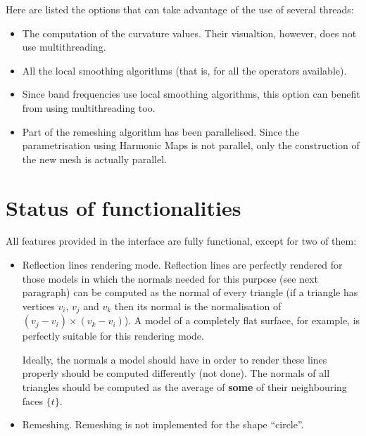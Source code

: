 \documentclass[12pt]{article}
\begin{document}
Here are listed the options that can take advantage of the use of
several threads:
\begin{itemize}
	\item The computation of the curvature values. Their visualtion, however,
	does not use multithreading.
	\item All the local smoothing algorithms (that is, for all the operators
	available).
	\item Since band frequencies use local smoothing algorithms, this
	option can benefit from using multithreading too.
	\item Part of the remeshing algorithm has been parallelised. Since
	the parametrisation using Harmonic Maps is not parallel, only the
	construction of the new mesh is actually parallel.
\end{itemize}

\section{Status of functionalities}

All features provided in the interface are fully functional, except for
two of them:
\begin{itemize}
	\item Reflection lines rendering mode. Reflection lines are perfectly
	rendered for those models in which the normals needed for this purpose
	(see next paragraph) can be computed as the normal of every triangle
	(if a triangle has vertices $v_i$, $v_j$ and $v_k$ then its normal is
	the normalisation of $(v_j - v_i) \times (v_k - v_i)$). A model of a
	completely flat surface, for example, is perfectly suitable for this
	rendering mode.
	
	\hfill
	
	Ideally, the normals a model should have in order to render these lines
	properly should be computed differently (not done). The normals of all
	triangles should be computed as the average of \textbf{some} of their
	neighbouring faces $\{t\}$.
	
	\item Remeshing. Remeshing is not implemented for the shape ``circle''.
\end{itemize}
\end{document}
